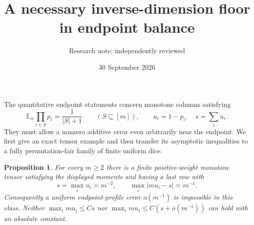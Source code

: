 \documentclass[11pt]{article}
\title{A necessary inverse-dimension floor in endpoint balance}
\author{Research note; independently reviewed}
\date{30 September 2026}
\newtheorem{proposition}{Proposition}
\begin{document}
\maketitle
The quantitative endpoint statements concern monotone columns satisfying
\[
 \mathbb E_w\prod_{i\in S}p_i=\frac1{|S|+1}
 \qquad(S\subseteq[m]),\qquad
 u_i=1-p_i,\quad s=\sum_i u_i.
\]
They must allow a nonzero additive error even arbitrarily near the
endpoint. We first give an exact tensor example and then transfer
its asymptotic inequalities to a fully permutation-fair family of
finite uniform dice.

\begin{proposition}
For every $m\ge2$ there is a finite positive-weight monotone tensor
satisfying the displayed moments and having a last row with
\[
 s=\max_i u_i\asymp m^{-2},\qquad
 \max_i|mu_i-s|\asymp m^{-1}.
\]
Consequently a uniform endpoint-profile error $o(m^{-1})$ is impossible
in this class. Neither $\max_i mu_i\le Cs$ nor
$\max_i mu_i\le C(s+o(m^{-1}))$ can hold with an absolute constant.
\end{proposition}
\end{document}
